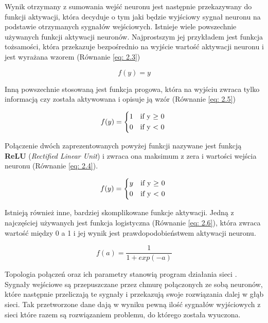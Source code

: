 \documentclass[12pt, oneside, a4paper]{report}
\begin{document}
Wynik otrzymany z sumowania wejść neuronu jest następnie przekazywany do funkcji aktywacji, która decyduje o tym jaki będzie wyjściowy sygnał neuronu na podstawie otrzymanych sygnałów wejściowych. Istnieje wiele powszechnie używanych funkcji aktywacji neuronów. Najprostszym jej przykładem jest funkcja tożsamości, która przekazuje bezpośrednio na wyjście wartość aktywacji neuronu i jest wyrażana wzorem (Równanie \ref{eq: 2.3})

\begin{equation}\label{eq: 2.3}
  f(y) = y
\end{equation}

Inną powszechnie stosowaną jest funkcja progowa, która na wyjściu zwraca tylko informacją czy została aktywowana i opisuje ją wzór (Równanie \ref{eq: 2.5})

\begin{equation}\label{eq: 2.5}
  f(y) =
  \begin{cases*}
    1 & if y $\geq$ 0 \\
    0 & if y < 0
  \end{cases*}
\end{equation}

Połączenie dwóch zaprezentowanych powyżej funkcji nazywane jest funkcją \textbf{ReLU} (\textit{Rectified Linear Unit}) i zwraca ona maksimum z zera i wartości wejścia neuronu (Równanie \ref{eq: 2.4}).

\begin{equation}\label{eq: 2.4}
    f(y) =
    \begin{cases*}
      y & if y $\geq$ 0 \\
      0 & if y < 0
    \end{cases*}
\end{equation}

Istnieją również inne, bardziej skomplikowane funkcje aktywacji. Jedną z najczęściej używanych jest funkcja logistyczna (Równanie \ref{eq: 2.6}), która zwraca wartość między 0 a 1 i jej wynik jest prawdopodobieństwem aktywacji neuronu.

\begin{equation}\label{eq: 2.6}
  f(a) = \frac{1}{1 + exp(-a)}
\end{equation}

Topologia połączeń oraz ich parametry stanowią program działania sieci \citep{tadeusiewicz1993sieci}. Sygnały wejściowe są przepuszczane przez chmurę połączonych ze sobą neuronów, które następnie przeliczają te sygnały i przekazują swoje rozwiązania dalej w głąb sieci. Tak przetworzone dane dają w wyniku pewną ilość sygnałów wyjściowych z sieci które razem są rozwiązaniem problemu, do którego została wyuczona.
\end{document}
